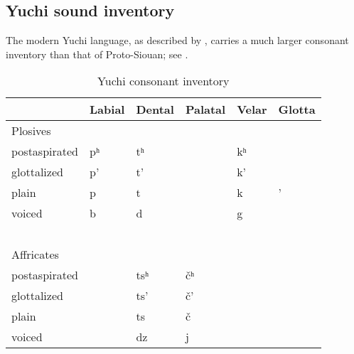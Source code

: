 \documentclass[output=paper]{LSP/langsci}
\begin{document}
\subsection{Yuchi sound inventory}

The modern Yuchi language, as described by \citet{Linn2000}, carries a much larger consonant inventory than that of Proto-Siouan; see .

\begin{table}[h!]
\caption{Yuchi consonant inventory} \label{yuchiinventory}
    \begin{tabular}{llllll}\lsptoprule
    ~                           & Labial    &  Dental      &  Palatal        &  Velar      & Glotta  \\
    \midrule
     Plosives            & ~                   & ~                    & ~                       & ~                   & ~                \\
    postaspirated               & pʰ & tʰ  & ~                       & kʰ & ~                \\
    glottalized                 & p'                  & t'                   & ~                       & k'                  & ~                \\
    plain                       & p                   & t                    & ~                       & k                   & '                \\
    voiced                      & b                   & d                    & ~                       & g                   & ~                \\
    ~                           & ~                   & ~                    & ~                       & ~                   & ~                \\
    Affricates        & ~                   & ~                    & ~                       & ~                   & ~                \\
    postaspirated               & ~                   & tsʰ & \v{c}ʰ & ~                   & ~                \\
    glottalized                 & ~                   & ts'                  & \v{c}'                  & ~                   & ~                \\
    plain                       & ~                   & ts                   & \v{c}                   & ~                   & ~                \\
    voiced                      & ~                   & dz                   & j                  & ~                   & ~                \\

\end{tabular}
\end{table}
\end{document}
